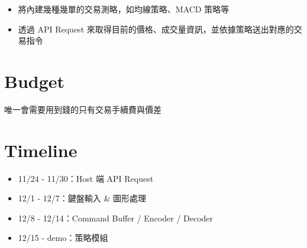 \documentclass[10.5pt,compsoc,UTF8]{CjC}
\theoremstyle{mystyle}
\begin{document}
\begin{itemize}
  \item 將內建幾種幾單的交易測略，如均線策略、MACD 策略等
  \item 透過 API Request 來取得目前的價格、成交量資訊，並依據策略送出對應的交易指令
\end{itemize}

\section{Budget}

唯一會需要用到錢的只有交易手續費與價差

\section{Timeline}

\begin{itemize}
  \item 11/24 - 11/30：Host 端 API Request
  \item 12/1 - 12/7：鍵盤輸入 \& 圖形處理
  \item 12/8 - 12/14：Command Buffer / Encoder / Decoder
  \item 12/15 - demo：策略模組
\end{itemize}
\end{document}

